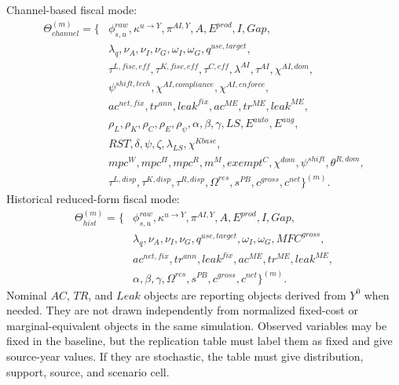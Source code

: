 \documentclass[11pt,a4paper]{article}
\begin{document}
Channel-based fiscal mode:
\begin{equation}
\begin{split}
    \Theta^{(m)}_{channel}=\{&\phi^{raw}_{s,u},\kappa^{u\to Y},\pi^{AI,Y},A,E^{prod},I,Gap,\\
    &\lambda_q,\nu_A,\nu_I,\nu_G,\omega_I,\omega_G,q^{use,target},\\
    &\tau^{L,fisc,eff},\tau^{K,fisc,eff},\tau^{C,eff},\lambda^{AI},\tau^{AI},\chi^{AI,dom},\\
    &\psi^{shift,tech},\chi^{AI,compliance},\chi^{AI,enforce},\\
    &ac^{net,fix},tr^{ann},leak^{fix},ac^{ME},tr^{ME},leak^{ME},\\
    &\rho_L,\rho_K,\rho_C,\rho_E,\rho_\psi,\alpha,\beta,\gamma,LS,E^{auto},E^{aug},\\
    &RST,\delta,\psi,\zeta,\lambda_{LS},\chi^{Kbase},\\
    &mpc^W,mpc^{\Pi},mpc^R,m^M,exempt^C,\chi^{dom},\psi^{shift},\theta^{R,dom},\\
    &\tau^{L,disp},\tau^{K,disp},\tau^{R,disp},\Omega^{res},s^{PB},c^{gross},c^{net}\}^{(m)}.
\end{split}
\end{equation}
Historical reduced-form fiscal mode:
\begin{equation}
\begin{split}
    \Theta^{(m)}_{hist}=\{&\phi^{raw}_{s,u},\kappa^{u\to Y},\pi^{AI,Y},A,E^{prod},I,Gap,\\
    &\lambda_q,\nu_A,\nu_I,\nu_G,q^{use,target},\omega_I,\omega_G,MFC^{gross},\\
    &ac^{net,fix},tr^{ann},leak^{fix},ac^{ME},tr^{ME},leak^{ME},\\
    &\alpha,\beta,\gamma,\Omega^{res},s^{PB},c^{gross},c^{net}\}^{(m)}.
\end{split}
\end{equation}
Nominal $AC$, $TR$, and $Leak$ objects are reporting objects derived from $Y^0$ when needed. They are not drawn independently from normalized fixed-cost or marginal-equivalent objects in the same simulation. Observed variables may be fixed in the baseline, but the replication table must label them as fixed and give source-year values. If they are stochastic, the table must give distribution, support, source, and scenario cell.
\end{document}
